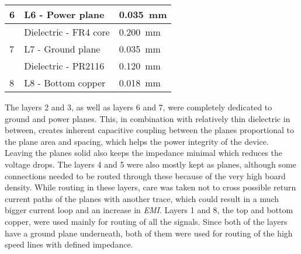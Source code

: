 \begin{table}[htp!]
\begin{tabular}{|l|l|l|}
    6                                    & L6 - Power plane                   & \SI{0.035}{\milli\meter}                                   \\ \hline
                                         & Dielectric - FR4 core              & \SI{0.200}{\milli\meter}                                   \\ \hline
    7                                    & L7 - Ground plane                  & \SI{0.035}{\milli\meter}                                   \\ \hline
                                         & Dielectric - PR2116                & \SI{0.120}{\milli\meter}                                   \\ \hline
    8                                    & L8 - Bottom copper                 & \SI{0.018}{\milli\meter}                                   \\ \hline
    \end{tabular}
    \label{tab:stackup}
\end{table}
\FloatBarrier
The layers 2 and 3, as well as layers 6 and 7, were completely dedicated to ground and power planes. This, in combination with relatively thin dielectric in between, creates inherent capacitive coupling between the planes proportional to the plane area and spacing, which helps the power integrity of the device. %
%
%
Leaving the planes solid also keeps the impedance minimal which reduces the voltage drops. The layers 4 and 5 were also mostly kept as planes, although some connections needed to be routed through these because of the very high board density. While routing in these layers, care was taken not to cross possible return current paths of the planes with another trace, which could result in a much bigger current loop and an increase in \emph{EMI}. Layers 1 and 8, the top and bottom copper, were used mainly for routing of all the signals. Since both of the layers have a ground plane underneath, both of them were used for routing of the high speed lines with defined impedance. 
%
